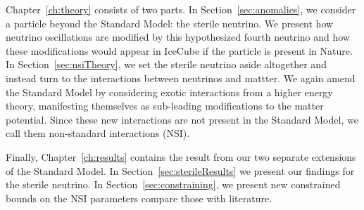 Chapter~\ref{ch:theory} consists of two parts. In Section~\ref{sec:anomalies}, we consider a particle beyond the Standard Model: the sterile neutrino. 
We present how neutrino oscillations are modified by this hypothesized fourth neutrino and how these modifications would appear in IceCube if the particle is present in Nature. 
In Section~\ref{sec:nsiTheory}, we set the sterile neutrino aside altogether and instead turn to the interactions between neutrinos and mattter. 
We again amend the Standard Model by considering exotic interactions from a higher energy theory, manifesting themselves as sub-leading modifications to the matter potential. 
Since these new interactions are not present in the Standard Model, we call them non-standard interactions (NSI). 

Finally, Chapter~\ref{ch:results} contains the result from our two separate extensions of the Standard Model.
In Section~\ref{sec:sterileResults} we present our findings for the sterile neutrino. 
In Section~\ref{sec:constraining}, we present new constrained bounds on the NSI parameters compare those with literature.